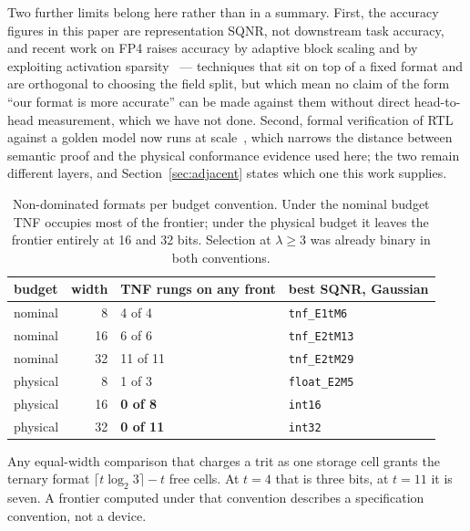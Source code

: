 Two further limits belong here rather than in a summary. First, the accuracy
figures in this paper are representation SQNR, not downstream task accuracy, and
recent work on FP4 raises accuracy by adaptive block scaling and by exploiting
activation sparsity~\cite{cook2025fourofsix,meng2026sharq} --- techniques that sit
on top of a fixed format and are orthogonal to choosing the field split, but which
mean no claim of the form ``our format is more accurate'' can be made against them
without direct head-to-head measurement, which we have not done. Second, formal
verification of RTL against a golden model now runs at
scale~\cite{li2026formalrtl}, which narrows the distance between semantic proof
and the physical conformance evidence used here; the two remain different layers,
and Section~\ref{sec:adjacent} states which one this work supplies.

\begin{table}[t]\centering
\caption{Non-dominated formats per budget convention. Under the nominal budget
TNF occupies most of the frontier; under the physical budget it leaves the
frontier entirely at 16 and 32 bits. Selection at $\lambda \ge 3$ was already
binary in both conventions.}
\label{tab:paretobudget}
\begin{tabular}{lrll}
\toprule
budget & width & TNF rungs on any front & best SQNR, Gaussian \\
\midrule
nominal  & 8  & 4 of 4  & \texttt{tnf\_E1tM6} \\
nominal  & 16 & 6 of 6  & \texttt{tnf\_E2tM13} \\
nominal  & 32 & 11 of 11 & \texttt{tnf\_E2tM29} \\
\addlinespace
physical & 8  & 1 of 3  & \texttt{float\_E2M5} \\
physical & 16 & \textbf{0 of 8} & \texttt{int16} \\
physical & 32 & \textbf{0 of 11} & \texttt{int32} \\
\bottomrule
\end{tabular}
\end{table}

\begin{observation}
\label{obs:budget}
Any equal-width comparison that charges a trit as one storage cell grants the
ternary format $\lceil t\log_2 3\rceil - t$ free cells. At $t = 4$ that is three
bits, at $t = 11$ it is seven. A frontier computed under that convention
describes a specification convention, not a device.
\end{observation}

